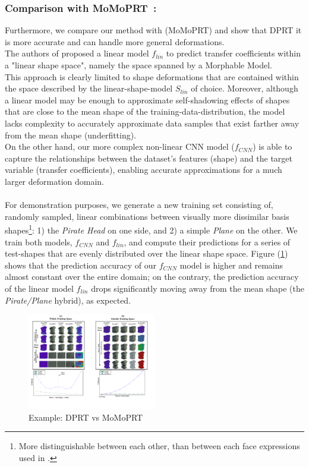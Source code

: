 \subsubsection*{\textbf{Comparison with MoMoPRT}~:}
Furthermore, we compare our method with \cite{MoMoPRT} (MoMoPRT) and show that DPRT it is more accurate and can handle more general deformations. \\
The authors of \cite{MoMoPRT} proposed a linear model $f_{lin}$ to predict transfer coefficients within a "linear shape space", namely the space spanned by a Morphable Model.\\
This approach is clearly limited to shape deformations that are contained within the space described by the linear-shape-model $S_{lin}$ of choice. Moreover, although a linear model may be enough to approximate self-shadowing effects of shapes that are close to the mean shape of the training-data-distribution, the model lacks complexity to accurately approximate data samples that exist farther away from the mean shape (underfitting).  
\\
On the other hand, our more complex non-linear CNN model ($f_{CNN}$) is able to capture the relationships between the dataset's features (shape) and the target variable (transfer coefficients), enabling accurate approximations for a much larger deformation domain.\\
\\
For demonstration purposes, we generate a new training set consisting of, randomly sampled, linear combinations between visually more dissimilar basis shapes\footnote{More distinguishable between each other, than between each face expressions used in \cite{MoMo}.}: 1) the \textit{Pirate Head } on one side, and 2)  a simple \textit{Plane} on the other. We train both models, $f_{CNN}$ and $f_{lin}$, and compute their predictions for a series of test-shapes that are evenly distributed over the linear shape space. Figure (\ref{Fig:DPRT vs MoMoPRT A}) shows that the prediction accuracy of our $f_{CNN}$ model is higher and remains almost constant over the entire domain; on the contrary, the prediction accuracy of the linear model $f_{lin}$ drops significantly moving away from the mean shape (the \textit{Pirate/Plane} hybrid), as expected. 
\begin{figure}[H]
  \centering
    \includegraphics[width=0.5\textwidth]{Figures/DPRT_vs_MoMoPRT_a.pdf}
     \caption{Example: DPRT vs MoMoPRT}
     \label{Fig:DPRT vs MoMoPRT A}
\end{figure}
